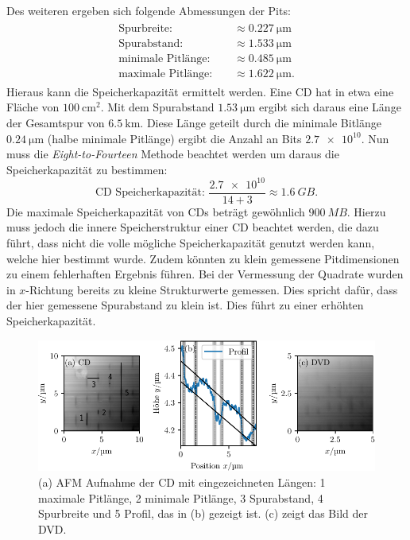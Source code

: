 Des weiteren ergeben sich folgende Abmessungen der Pits:
\begin{align}
  \begin{aligned}
    \text{Spurbreite: } &     &\approx  \SI{0.227}{\micro\meter}\\
    \text{Spurabstand: } &        &\approx \SI{1.533}{\micro\meter} \\
    \text{minimale Pitlänge: } &     &\approx \SI{0.485}{\micro\meter} \\
    \text{maximale Pitlänge: } &    &\approx \SI{1.622}{\micro\meter}.
  \end{aligned}
\end{align}
Hieraus kann die Speicherkapazität ermittelt werden. Eine CD hat in etwa eine Fläche von $\SI{100}{\centi\meter\squared}$. Mit dem Spurabstand
$\SI{1.53}{\micro\meter}$ ergibt sich daraus
eine Länge der Gesamtspur von $\SI{6.5}{\kilo\meter}$. Diese Länge geteilt durch die minimale Bitlänge $\SI{0.24}{\micro\meter}$
(halbe minimale Pitlänge) ergibt die Anzahl an Bits $\num{2.7e10}$.
Nun muss die \textit{Eight-to-Fourteen}
Methode beachtet werden um daraus die Speicherkapazität zu bestimmen:
\begin{equation}
  \text{CD Speicherkapazität: } \frac{\num{2.7e10}}{14 + 3} \approx \SI{1.6}{GB}.
\end{equation}
Die maximale Speicherkapazität von CDs beträgt gewöhnlich $\SI{900}{MB}$. Hierzu muss jedoch die innere Speicherstruktur einer CD beachtet werden, die dazu führt,
dass nicht die volle mögliche Speicherkapazität genutzt werden kann, welche hier bestimmt wurde. Zudem könnten zu klein gemessene Pitdimensionen
zu einem fehlerhaften Ergebnis führen. Bei der Vermessung der Quadrate wurden in $x$-Richtung bereits zu kleine Strukturwerte gemessen. Dies spricht dafür,
dass der hier gemessene Spurabstand zu klein ist. Dies führt zu einer erhöhten Speicherkapazität.

\begin{figure}
  \centering
  \includegraphics[scale = 1]{../analysis/data/cd/cd_profil.pdf}
  \caption{(a) AFM Aufnahme der CD mit eingezeichneten Längen: 1 maximale Pitlänge, 2 minimale Pitlänge,
  3 Spurabstand, 4 Spurbreite und 5 Profil, das in (b) gezeigt ist. (c) zeigt das Bild der DVD.}
  \label{fig: cd}
\end{figure}

